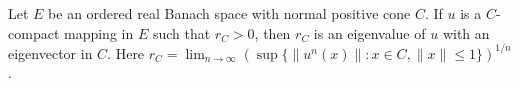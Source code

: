 Let $E$ be an ordered real Banach space with normal positive cone $C$. If $u$ is a $C$-compact mapping in $E$ such that $r_C > 0$, then $r_C$ is an eigenvalue of $u$ with an eigenvector in $C$. Here $r_C = \lim_{n \to \infty} (\sup\{\|u^n(x)\|: x \in C, \|x\| \leq 1\})^{1/n}$.
